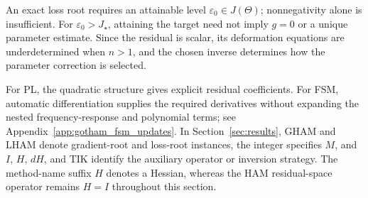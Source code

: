 \begin{remark}
An exact loss root requires an attainable level
$\varepsilon_0\in J(\Theta)$; nonnegativity alone is insufficient.
For $\varepsilon_0>J_\star$, attaining the target need not imply
$g=0$ or a unique parameter estimate. Since the residual is scalar,
its deformation equations are underdetermined when $n>1$, and the
chosen inverse determines how the parameter correction is selected.
\end{remark}

\begin{remark}
For PL, the quadratic structure gives explicit residual coefficients.
For FSM, automatic differentiation supplies the required derivatives
without expanding the nested frequency-response and polynomial terms;
see Appendix~\ref{app:gotham_fsm_updates}. In
Section~\ref{sec:results}, GHAM and LHAM denote gradient-root and
loss-root instances, the integer specifies $M$, and $I$, $H$, $dH$,
and TIK identify the auxiliary operator or inversion strategy.
The method-name suffix $H$ denotes a Hessian, whereas the HAM
residual-space operator remains $H=I$ throughout this section.
\end{remark}
